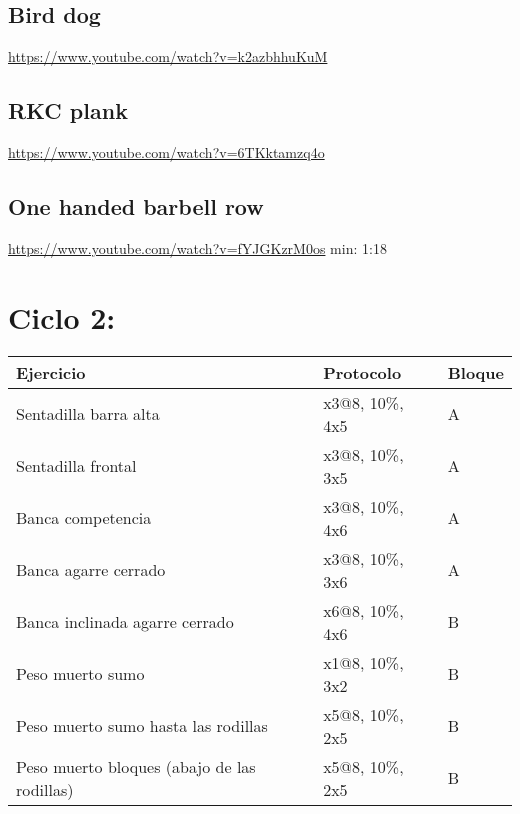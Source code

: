 \documentclass[11pt]{article}
\begin{document}
\subsection{Bird dog}
\label{sec:org6cf08f3}
\url{https://www.youtube.com/watch?v=k2azbhhuKuM}
\subsection{RKC plank}
\label{sec:org130e1a7}
\url{https://www.youtube.com/watch?v=6TKktamzq4o}
\subsection{One handed barbell row}
\label{sec:orgdfcc8e9}
\url{https://www.youtube.com/watch?v=fYJGKzrM0os} min: 1:18

\section{Ciclo 2:}
\label{sec:orgdd1aca2}
\begin{center}
\begin{tabular}{lll}
Ejercicio & Protocolo & Bloque\\
\hline
Sentadilla barra alta & x3@8, 10\%, 4x5 & A\\
Sentadilla frontal & x3@8, 10\%, 3x5 & A\\
Banca competencia & x3@8, 10\%, 4x6 & A\\
Banca agarre cerrado & x3@8, 10\%, 3x6 & A\\
\hline
Banca inclinada agarre cerrado & x6@8, 10\%, 4x6 & B\\
Peso muerto sumo & x1@8, 10\%, 3x2 & B\\
Peso muerto sumo hasta las rodillas & x5@8, 10\%, 2x5 & B\\
Peso muerto bloques (abajo de las rodillas) & x5@8, 10\%, 2x5 & B\\
\hline
\end{tabular}
\end{center}
\end{document}

